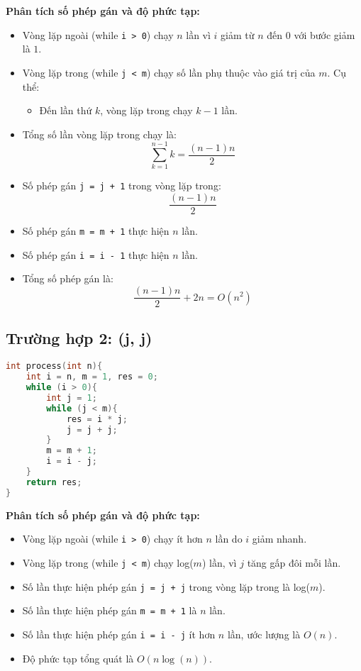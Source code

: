 \documentclass[12pt,a4paper]{article}
\begin{document}
\textbf{Phân tích số phép gán và độ phức tạp:}
\begin{itemize}
    \item Vòng lặp ngoài (while \texttt{i > 0}) chạy $n$ lần vì $i$ giảm từ $n$ đến $0$ với bước giảm là $1$.
    \item Vòng lặp trong (while \texttt{j < m}) chạy số lần phụ thuộc vào giá trị của $m$. Cụ thể:
    \begin{itemize}[label=$\bullet$]
        
        \item Đến lần thứ $k$, vòng lặp trong chạy $k-1$ lần.
    \end{itemize}
    \item Tổng số lần vòng lặp trong chạy là: 
    \[
    \sum_{k=1}^{n-1} k = \frac{(n-1)n}{2}
    \]
    \item Số phép gán \texttt{j = j + 1} trong vòng lặp trong: 
    \[
    \frac{(n-1)n}{2}
    \]
    \item Số phép gán \texttt{m = m + 1} thực hiện $n$ lần.
    \item Số phép gán \texttt{i = i - 1} thực hiện $n$ lần.
    \item Tổng số phép gán là:
    \[
    \frac{(n-1)n}{2} + 2n = O(n^2)
    \]
\end{itemize}

\subsection*{Trường hợp 2: (j, j)}
\begin{lstlisting}[language=C++]
int process(int n){
    int i = n, m = 1, res = 0;
    while (i > 0){
        int j = 1;
        while (j < m){
            res = i * j;
            j = j + j;
        }
        m = m + 1;
        i = i - j;
    }
    return res;
}
\end{lstlisting}

\textbf{Phân tích số phép gán và độ phức tạp:}
\begin{itemize}
    \item Vòng lặp ngoài (while \texttt{i > 0}) chạy ít hơn $n$ lần do $i$ giảm nhanh.
    \item Vòng lặp trong (while \texttt{j < m}) chạy log($m$) lần, vì $j$ tăng gấp đôi mỗi lần.
    \item Số lần thực hiện phép gán \texttt{j = j + j} trong vòng lặp trong là log($m$).
    \item Số lần thực hiện phép gán \texttt{m = m + 1} là $n$ lần.
    \item Số lần thực hiện phép gán \texttt{i = i - j} ít hơn $n$ lần, ước lượng là $O(n)$.
    \item Độ phức tạp tổng quát là $O(n \log(n))$.
\end{itemize}
\end{document}
